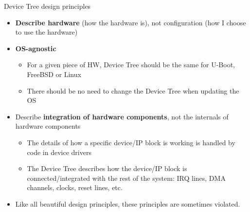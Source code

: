 \begin{frame}{Device Tree design principles}
  \begin{itemize}
  \item {\bf Describe hardware} (how the hardware is), not
    configuration (how I choose to use the hardware)
  \item {\bf OS-agnostic}
    \begin{itemize}
    \item For a given piece of HW, Device Tree should be the same for
      U-Boot, FreeBSD or Linux
    \item There should be no need to change the Device Tree when updating the OS
    \end{itemize}
  \item Describe {\bf integration of hardware components}, not the internals
    of hardware components
    \begin{itemize}
    \item The details of how a specific device/IP block is working is
      handled by code in device drivers
    \item The Device Tree describes how the device/IP block is
      connected/integrated with the rest of the system: IRQ lines, DMA
      channels, clocks, reset lines, etc.
    \end{itemize}
  \item Like all beautiful design principles, these principles are
    sometimes violated.
  \end{itemize}
\end{frame}

